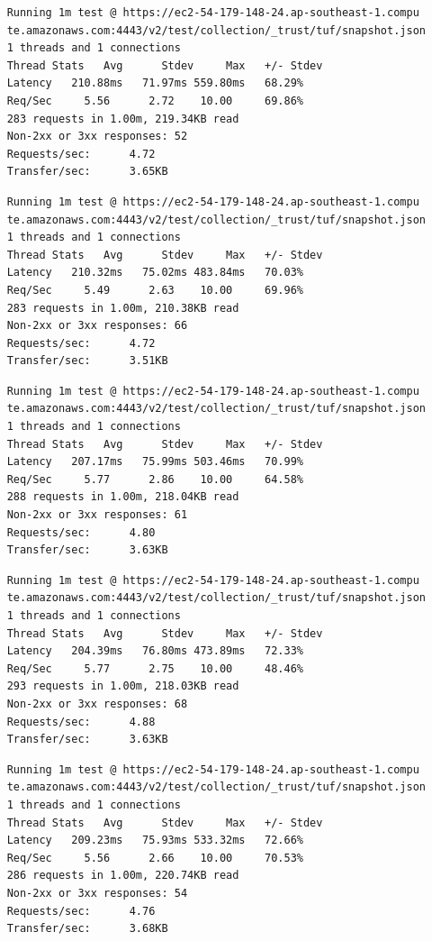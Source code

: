 \documentclass[a4paper,12pt]{article}
\newcounter{subsubsubsection}[subsubsection]
\begin{document}
{{	
	\begin{verbatim}
	Running 1m test @ https://ec2-54-179-148-24.ap-southeast-1.compu
	te.amazonaws.com:4443/v2/test/collection/_trust/tuf/snapshot.json
	1 threads and 1 connections
	Thread Stats   Avg      Stdev     Max   +/- Stdev
	Latency   210.88ms   71.97ms 559.80ms   68.29%
	Req/Sec     5.56      2.72    10.00     69.86%
	283 requests in 1.00m, 219.34KB read
	Non-2xx or 3xx responses: 52
	Requests/sec:      4.72
	Transfer/sec:      3.65KB
	\end{verbatim}
	\begin{verbatim}
	Running 1m test @ https://ec2-54-179-148-24.ap-southeast-1.compu
	te.amazonaws.com:4443/v2/test/collection/_trust/tuf/snapshot.json
	1 threads and 1 connections
	Thread Stats   Avg      Stdev     Max   +/- Stdev
	Latency   210.32ms   75.02ms 483.84ms   70.03%
	Req/Sec     5.49      2.63    10.00     69.96%
	283 requests in 1.00m, 210.38KB read
	Non-2xx or 3xx responses: 66
	Requests/sec:      4.72
	Transfer/sec:      3.51KB
	\end{verbatim}
	\begin{verbatim}
	Running 1m test @ https://ec2-54-179-148-24.ap-southeast-1.compu
	te.amazonaws.com:4443/v2/test/collection/_trust/tuf/snapshot.json
	1 threads and 1 connections
	Thread Stats   Avg      Stdev     Max   +/- Stdev
	Latency   207.17ms   75.99ms 503.46ms   70.99%
	Req/Sec     5.77      2.86    10.00     64.58%
	288 requests in 1.00m, 218.04KB read
	Non-2xx or 3xx responses: 61
	Requests/sec:      4.80
	Transfer/sec:      3.63KB
	\end{verbatim}
	\begin{verbatim}
	Running 1m test @ https://ec2-54-179-148-24.ap-southeast-1.compu
	te.amazonaws.com:4443/v2/test/collection/_trust/tuf/snapshot.json
	1 threads and 1 connections
	Thread Stats   Avg      Stdev     Max   +/- Stdev
	Latency   204.39ms   76.80ms 473.89ms   72.33%
	Req/Sec     5.77      2.75    10.00     48.46%
	293 requests in 1.00m, 218.03KB read
	Non-2xx or 3xx responses: 68
	Requests/sec:      4.88
	Transfer/sec:      3.63KB
	\end{verbatim}
	\newpage
	\begin{verbatim}
	Running 1m test @ https://ec2-54-179-148-24.ap-southeast-1.compu
	te.amazonaws.com:4443/v2/test/collection/_trust/tuf/snapshot.json
	1 threads and 1 connections
	Thread Stats   Avg      Stdev     Max   +/- Stdev
	Latency   209.23ms   75.93ms 533.32ms   72.66%
	Req/Sec     5.56      2.66    10.00     70.53%
	286 requests in 1.00m, 220.74KB read
	Non-2xx or 3xx responses: 54
	Requests/sec:      4.76
	Transfer/sec:      3.68KB
	\end{verbatim}
	\newpage
	
}}
\end{document}
